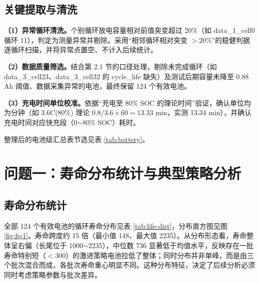 \documentclass[withoutpreface]{cumcmthesis}
\begin{document}
\subsection{关键提取与清洗}

\textbf{（1）异常循环清洗。}个别循环放电容量相对前值突变超过 20\%（如 data\_1\_cell0 循环 11），判定为测量异常并剔除。采用“相邻循环相对突变 $>20\%$”的稳健判据逐循环扫描，并将异常点置空、不计入后续统计。

\textbf{（2）数据质量筛选。}结合第 2.1 节的口径处理，剔除未完成循环（如 data\_3\_cell23、data\_3\_cell32 的 cycle\_life 缺失）及测试后期容量未降至 0.88 Ah 阈值、数据采集异常的电池，最终保留 124 个有效电池。

\textbf{（3）充电时间单位校准。}依据“充电至 80\% SOC 的理论时间”验证，确认单位均为分钟（如 3.6C(80\%) 理论 $0.8/3.6\times60=13.33$ min，实测 13.34 min），并确认充电时间对应快充段（0$\sim$80\% SOC）耗时。

整理后的电池级汇总表节选见表 \ref{tab:battery}。

\begin{table}[htbp]
\centering
\caption{电池级汇总表（节选）}
\label{tab:battery}
\end{table}

\section{问题一：寿命分布统计与典型策略分析}

\subsection{寿命分布统计}

全部 124 个有效电池的循环寿命分布见表 \ref{tab:life-dist}，分布直方图见图 \ref{fig:fig1}。寿命跨度约 15 倍（最小值 148、最大值 2235）。从分布形态看，寿命整体呈右偏（长尾位于 1000$\sim$2235），中位数 736 显著低于均值水平，反映存在一批寿命特别短（$<300$）的激进策略电池拉低了整体；同时分布并非单峰，而是由三个批次混合而成，各批次寿命重心明显不同。这种分布特征，决定了后续分析必须同时考虑策略参数与批次差异。
\end{document}
